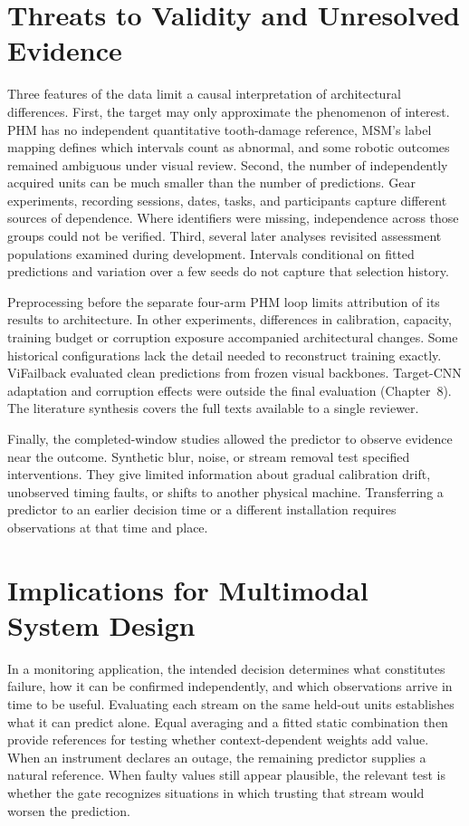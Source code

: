 \section{Threats to Validity and Unresolved Evidence}
Three features of the data limit a causal interpretation of architectural differences. First, the target may only approximate the phenomenon of interest. PHM has no independent quantitative tooth-damage reference, MSM's label mapping defines which intervals count as abnormal, and some robotic outcomes remained ambiguous under visual review. Second, the number of independently acquired units can be much smaller than the number of predictions. Gear experiments, recording sessions, dates, tasks, and participants capture different sources of dependence. Where identifiers were missing, independence across those groups could not be verified. Third, several later analyses revisited assessment populations examined during development. Intervals conditional on fitted predictions and variation over a few seeds do not capture that selection history.

Preprocessing before the separate four-arm PHM loop limits attribution of its results to architecture. In other experiments, differences in calibration, capacity, training budget or corruption exposure accompanied architectural changes. Some historical configurations lack the detail needed to reconstruct training exactly. ViFailback evaluated clean predictions from frozen visual backbones. Target-CNN adaptation and corruption effects were outside the final evaluation (Chapter~8). The literature synthesis covers the full texts available to a single reviewer.

Finally, the completed-window studies allowed the predictor to observe evidence near the outcome. Synthetic blur, noise, or stream removal test specified interventions. They give limited information about gradual calibration drift, unobserved timing faults, or shifts to another physical machine. Transferring a predictor to an earlier decision time or a different installation requires observations at that time and place.

\section{Implications for Multimodal System Design}
In a monitoring application, the intended decision determines what constitutes failure, how it can be confirmed independently, and which observations arrive in time to be useful. Evaluating each stream on the same held-out units establishes what it can predict alone. Equal averaging and a fitted static combination then provide references for testing whether context-dependent weights add value. When an instrument declares an outage, the remaining predictor supplies a natural reference. When faulty values still appear plausible, the relevant test is whether the gate recognizes situations in which trusting that stream would worsen the prediction.

